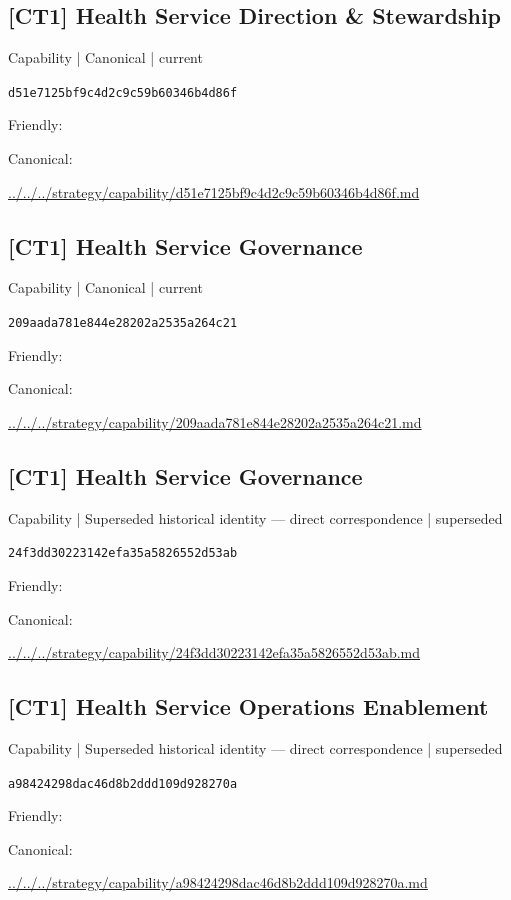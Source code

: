 \documentclass[10pt,a4paper]{article}
\begin{document}
\subsection*{[CT1] Health Service Direction \& Stewardship}
{\small Capability | Canonical | current}\par
\texttt{d51e7125bf9c4d2c9c59b60346b4d86f}\par
Friendly: \par
Canonical: \par
{\footnotesize\url{../../../strategy/capability/d51e7125bf9c4d2c9c59b60346b4d86f.md}}\par
\subsection*{[CT1] Health Service Governance}
{\small Capability | Canonical | current}\par
\texttt{209aada781e844e28202a2535a264c21}\par
Friendly: \par
Canonical: \par
{\footnotesize\url{../../../strategy/capability/209aada781e844e28202a2535a264c21.md}}\par
\subsection*{[CT1] Health Service Governance}
{\small Capability | Superseded historical identity — direct correspondence | superseded}\par
\texttt{24f3dd30223142efa35a5826552d53ab}\par
Friendly: \par
Canonical: \par
{\footnotesize\url{../../../strategy/capability/24f3dd30223142efa35a5826552d53ab.md}}\par
\subsection*{[CT1] Health Service Operations Enablement}
{\small Capability | Superseded historical identity — direct correspondence | superseded}\par
\texttt{a98424298dac46d8b2ddd109d928270a}\par
Friendly: \par
Canonical: \par
{\footnotesize\url{../../../strategy/capability/a98424298dac46d8b2ddd109d928270a.md}}\par
\end{document}
